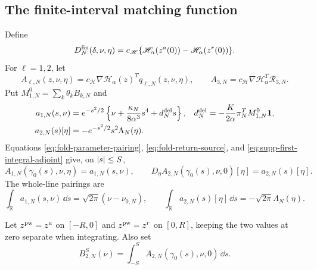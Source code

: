 \subsection{The finite-interval matching function}

Define
\begin{equation}
 D_N^{\rm fin}(\delta,\nu,\eta)
 =c_{\mathscr H}\{
     \mathscr H_\alpha(z^a(0))-
     \mathscr H_\alpha(z^r(0))\}.
 \label{eq:supp-finite-comparison-definition}
\end{equation}
For \(\ell=1,2\), let
\begin{equation}
 A_{\ell,N}(z,\nu,\eta)
 =c_{\mathscr H}\nabla\mathscr H_\alpha(z)^T
      q_{\ell,N}(z,\nu,\eta),\qquad
 A_{3,N}=c_{\mathscr H}\nabla\mathscr H_\alpha^T\mathcal R_{3,N}.
 \label{eq:supp-integrands}
\end{equation}
Put \(M_{1,N}^0=\sum_k\theta_kB_{k,N}\) and
\begin{align}
 a_{1,N}(s,\nu)
 &=e^{-s^2/2}\left\{
    \nu+\frac{\kappa_N}{8\alpha^3}s^4+d_N^{\rm del}s\right\},
 &d_N^{\rm del}&=-\frac K{2\alpha}\pi_N^TM_{1,N}^0\mathbf1,
 \label{eq:supp-leading-integrand}\\
 a_{2,N}(s)[\eta]
 &=-e^{-s^2/2}s^2\Lambda_N(\eta).
 \label{eq:supp-structural-integrand}
\end{align}
Equations \eqref{eq:fold-parameter-pairing},
\eqref{eq:fold-return-source}, and
\eqref{eq:supp-first-integral-adjoint} give, on \(\left\lvert s\right\rvert\le S\),
\begin{equation}
 A_{1,N}(\gamma_0(s),\nu,\eta)=a_{1,N}(s,\nu),\qquad
 D_\eta A_{2,N}(\gamma_0(s),\nu,0)[\eta]=a_{2,N}(s)[\eta].
 \label{eq:supp-central-integrand-identities}
\end{equation}
The whole-line pairings are
\begin{equation}
 \int_{\mathbb R}a_{1,N}(s,\nu)\,\dd s
 =\sqrt{2\pi}(\nu-\nu_{0,N}),\qquad
 \int_{\mathbb R}a_{2,N}(s)[\eta]\,\dd s
 =-\sqrt{2\pi}\Lambda_N(\eta).
 \label{eq:supp-whole-line-pairings}
\end{equation}

Let \(z^{\rm pw}=z^a\) on \([-R,0]\) and \(z^{\rm pw}=z^r\) on
\([0,R]\), keeping the two values at zero separate when integrating.
Also set
\begin{equation}
 B_{2,N}^S(\nu)=
 \int_{-S}^SA_{2,N}(\gamma_0(s),\nu,0)\,\dd s.
 \label{eq:supp-baseline-second-order}
\end{equation}

